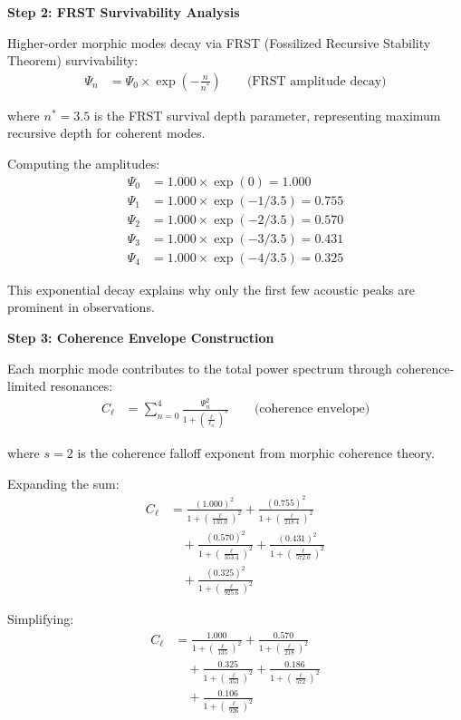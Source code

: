 \textbf{Step 2: FRST Survivability Analysis}

Higher-order morphic modes decay via FRST (Fossilized Recursive Stability Theorem) survivability:
\begin{align}
\Psi_n &= \Psi_0 \times \exp\left(-\frac{n}{n^*}\right) \qquad \text{(FRST amplitude decay)}
\end{align}

where $n^* = 3.5$ is the FRST survival depth parameter, representing maximum recursive depth for coherent modes.

Computing the amplitudes:
\begin{align}
\Psi_0 &= 1.000 \times \exp(0) = 1.000 \\
\Psi_1 &= 1.000 \times \exp(-1/3.5) = 0.755 \\
\Psi_2 &= 1.000 \times \exp(-2/3.5) = 0.570 \\
\Psi_3 &= 1.000 \times \exp(-3/3.5) = 0.431 \\
\Psi_4 &= 1.000 \times \exp(-4/3.5) = 0.325
\end{align}

This exponential decay explains why only the first few acoustic peaks are prominent in observations.

\textbf{Step 3: Coherence Envelope Construction}

Each morphic mode contributes to the total power spectrum through coherence-limited resonances:
\begin{align}
C_\ell &= \sum_{n=0}^{4} \frac{\Psi_n^2}{1 + \left(\frac{\ell}{\ell_n}\right)^s} \qquad \text{(coherence envelope)}
\end{align}

where $s = 2$ is the coherence falloff exponent from morphic coherence theory.

Expanding the sum:
\begin{align}
C_\ell &= \frac{(1.000)^2}{1 + \left(\frac{\ell}{135.0}\right)^2} + \frac{(0.755)^2}{1 + \left(\frac{\ell}{218.4}\right)^2} \\
&\quad + \frac{(0.570)^2}{1 + \left(\frac{\ell}{353.4}\right)^2} + \frac{(0.431)^2}{1 + \left(\frac{\ell}{572.0}\right)^2} \\
&\quad + \frac{(0.325)^2}{1 + \left(\frac{\ell}{925.6}\right)^2}
\end{align}

Simplifying:
\begin{align}
C_\ell &= \frac{1.000}{1 + \left(\frac{\ell}{135}\right)^2} + \frac{0.570}{1 + \left(\frac{\ell}{218}\right)^2} \\
&\quad + \frac{0.325}{1 + \left(\frac{\ell}{353}\right)^2} + \frac{0.186}{1 + \left(\frac{\ell}{572}\right)^2} \\
&\quad + \frac{0.106}{1 + \left(\frac{\ell}{926}\right)^2}
\end{align}


